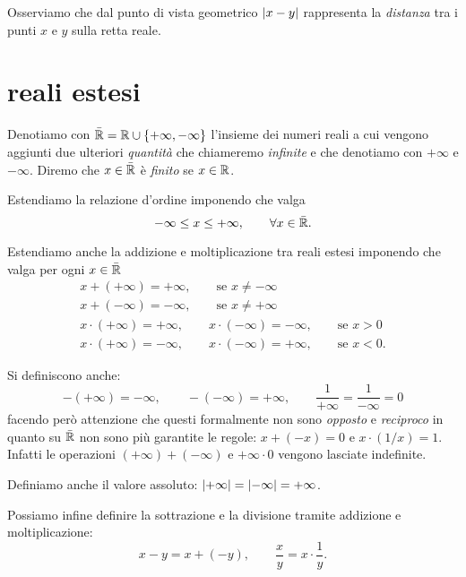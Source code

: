 Osserviamo che dal punto di vista geometrico
${\left|x-y\right|}$ rappresenta la \emph{distanza} tra i punti
$x$ e $y$ sulla retta reale.

\section{reali estesi}


\begin{definition}
\mymargin{$\bar{\RR}$}
Denotiamo con $\bar {\mathbb R}=\mathbb R \cup \{+\infty, -\infty\}$ l'insieme dei numeri reali
\mymargin{$+\infty$, $-\infty$}
a cui vengono aggiunti due ulteriori \emph{quantità} che chiameremo
\emph{infinite} e che denotiamo con $+\infty$ e $-\infty$.
Diremo che $x\in \bar {\mathbb R}$ è \emph{finito} se $x\in \mathbb R$.
\end{definition}


Estendiamo la relazione d'ordine imponendo che valga
\[
  -\infty \le x \le +\infty, \qquad \forall x \in \bar{\mathbb R}.
\]

Estendiamo anche la addizione e moltiplicazione
tra reali estesi imponendo che valga per ogni $x\in \bar {\mathbb R}$
\begin{gather*}
  x + (+\infty) = +\infty, \qquad \text{se $x\neq -\infty$}\\
  x + (-\infty) = -\infty, \qquad \text{se $x\neq +\infty$}\\
  x \cdot (+\infty) = +\infty, \qquad
  x \cdot (-\infty) = -\infty, \qquad \text{se $x>0$} \\
  x \cdot (+\infty) = -\infty, \qquad
  x \cdot (-\infty) = +\infty, \qquad \text{se $x<0$}.
\end{gather*}

Si definiscono anche:
\[
 -(+\infty) = -\infty, \qquad
 -(-\infty) = +\infty, \qquad
 \frac{1}{+\infty} = \frac{1}{-\infty}=0
\]
facendo però attenzione che
questi formalmente non sono \emph{opposto}
e \emph{reciproco} in quanto
su $\bar {\mathbb R}$ non sono più garantite
le regole: $x + (-x) = 0$ e $x \cdot (1/x) = 1$.
Infatti
le operazioni $(+\infty) + (-\infty)$ e $+\infty \cdot 0$ vengono
lasciate indefinite.

Definiamo anche il valore assoluto: ${\left|+\infty\right|} = {\left|-\infty\right|} = +\infty$.

Possiamo infine definire la sottrazione e la divisione tramite
addizione e moltiplicazione:
\[
  x - y = x + (-y), \qquad \frac{x}{y} = x \cdot \frac{1}{y}.
\]

